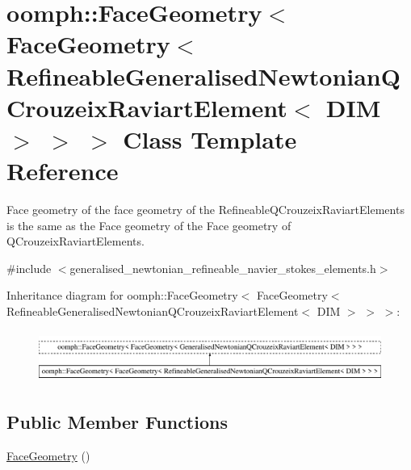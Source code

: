\hypertarget{classoomph_1_1FaceGeometry_3_01FaceGeometry_3_01RefineableGeneralisedNewtonianQCrouzeixRaviartElement_3_01DIM_01_4_01_4_01_4}{}\section{oomph\+:\+:Face\+Geometry$<$ Face\+Geometry$<$ Refineable\+Generalised\+Newtonian\+Q\+Crouzeix\+Raviart\+Element$<$ D\+IM $>$ $>$ $>$ Class Template Reference}
\label{classoomph_1_1FaceGeometry_3_01FaceGeometry_3_01RefineableGeneralisedNewtonianQCrouzeixRaviartElement_3_01DIM_01_4_01_4_01_4}


Face geometry of the face geometry of the Refineable\+Q\+Crouzeix\+Raviart\+Elements is the same as the Face geometry of the Face geometry of Q\+Crouzeix\+Raviart\+Elements.  




{\ttfamily \#include $<$generalised\+\_\+newtonian\+\_\+refineable\+\_\+navier\+\_\+stokes\+\_\+elements.\+h$>$}

Inheritance diagram for oomph\+:\+:Face\+Geometry$<$ Face\+Geometry$<$ Refineable\+Generalised\+Newtonian\+Q\+Crouzeix\+Raviart\+Element$<$ D\+IM $>$ $>$ $>$\+:\begin{figure}[H]
\begin{center}
\leavevmode
\includegraphics[height=1.709924cm]{classoomph_1_1FaceGeometry_3_01FaceGeometry_3_01RefineableGeneralisedNewtonianQCrouzeixRaviartElement_3_01DIM_01_4_01_4_01_4}
\end{center}
\end{figure}
\subsection*{Public Member Functions}
\begin{DoxyCompactItemize}
\item 
\hyperlink{classoomph_1_1FaceGeometry_3_01FaceGeometry_3_01RefineableGeneralisedNewtonianQCrouzeixRaviartElement_3_01DIM_01_4_01_4_01_4_a7ed622cc9aa9c54e7be87cf2fd3c4168}{Face\+Geometry} ()
\end{DoxyCompactItemize}


